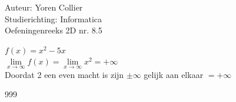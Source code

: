 \documentclass[a4paper]{article}
\newcommand{\pnR}{\rightarrow} %
\newcommand{\limiet}{\lim\limits_}
\begin{document}
\noindent \large Auteur: Yoren Collier \\
\noindent \large Studierichting: Informatica\\
\noindent \large Oefeningenreeks 2D nr. 8.5\\

\medskip

\normalsize

$f(x) = x^2 - 5x$\\

$\limiet{x \pnR \infty} f(x) = \limiet{x \pnR \infty} x^2 = +\infty$\\

Doordat 2 een even macht is zijn $\pm\infty$ gelijk aan elkaar $= +\infty$\\

\begin{thebibliography}{999}
\end{thebibliography}
\end{document}
